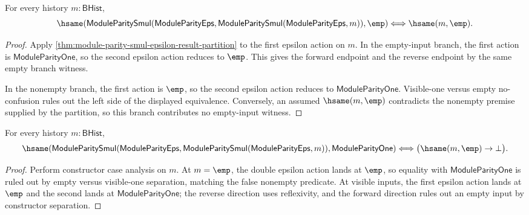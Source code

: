 \begin{theorem}
\label{thm:module-parity-epsilon-double-action-empty-iff}
For every history $m:\mathsf{BHist}$,
$$
\hsame(\mathsf{ModuleParitySmul}(\mathsf{ModuleParityEps},
  \mathsf{ModuleParitySmul}(\mathsf{ModuleParityEps},m)),\emp)
\Longleftrightarrow
\hsame(m,\emp).
$$
\end{theorem}
\begin{proof}
Apply \autoref{thm:module-parity-smul-epsilon-result-partition} to the first
epsilon action on $m$. In the empty-input branch, the first action is
$\mathsf{ModuleParityOne}$, so the second epsilon action reduces to $\emp$.
This gives the forward endpoint and the reverse endpoint by the same empty
branch witness.

In the nonempty branch, the first action is $\emp$, so the second epsilon
action reduces to $\mathsf{ModuleParityOne}$. Visible-one versus empty
no-confusion rules out the left side of the displayed equivalence. Conversely,
an assumed $\hsame(m,\emp)$ contradicts the nonempty premise supplied by the
partition, so this branch contributes no empty-input witness.
\end{proof}

\begin{theorem}
\label{thm:module-parity-smul-epsilon-double-action-one-iff}
For every history $m:\mathsf{BHist}$,
$$
\hsame(\mathsf{ModuleParitySmul}(\mathsf{ModuleParityEps},
  \mathsf{ModuleParitySmul}(\mathsf{ModuleParityEps},m)),
  \mathsf{ModuleParityOne})
\Longleftrightarrow
\bigl(\hsame(m,\emp)\to\bot\bigr).
$$
\end{theorem}
\begin{proof}
Perform constructor case analysis on $m$. At $m=\emp$, the double epsilon
action lands at $\emp$, so equality with $\mathsf{ModuleParityOne}$ is ruled
out by empty versus visible-one separation, matching the false nonempty
predicate. At visible inputs, the first epsilon action lands at $\emp$ and the
second lands at $\mathsf{ModuleParityOne}$; the reverse direction uses
reflexivity, and the forward direction rules out an empty input by constructor
separation.
\end{proof}
